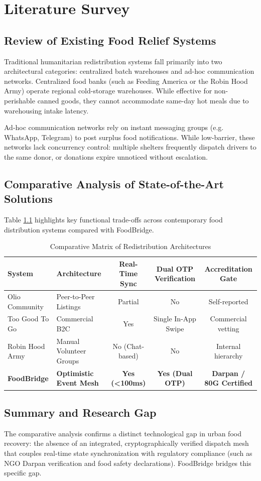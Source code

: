 \chapter{Literature Survey}
\label{ch:literature_survey}

\section{Review of Existing Food Relief Systems}
Traditional humanitarian redistribution systems fall primarily into two architectural categories: centralized batch warehouses and ad-hoc communication networks. Centralized food banks (such as Feeding America or the Robin Hood Army) operate regional cold-storage warehouses. While effective for non-perishable canned goods, they cannot accommodate same-day hot meals due to warehousing intake latency.

Ad-hoc communication networks rely on instant messaging groups (e.g. WhatsApp, Telegram) to post surplus food notifications. While low-barrier, these networks lack concurrency control: multiple shelters frequently dispatch drivers to the same donor, or donations expire unnoticed without escalation.

\section{Comparative Analysis of State-of-the-Art Solutions}
Table \ref{tab:literature_comparison} highlights key functional trade-offs across contemporary food distribution systems compared with FoodBridge.

\begin{table}[htbp]
\centering
\caption{Comparative Matrix of Redistribution Architectures}
\label{tab:literature_comparison}
\begin{tabularx}{\textwidth}{l X c c c}
\toprule
\textbf{System} & \textbf{Architecture} & \textbf{Real-Time Sync} & \textbf{Dual OTP Verification} & \textbf{Accreditation Gate} \\
\midrule
Olio Community & Peer-to-Peer Listings & Partial & No & Self-reported \\
Too Good To Go & Commercial B2C & Yes & Single In-App Swipe & Commercial vetting \\
Robin Hood Army & Manual Volunteer Groups & No (Chat-based) & No & Internal hierarchy \\
\textbf{FoodBridge} & \textbf{Optimistic Event Mesh} & \textbf{Yes (<100ms)} & \textbf{Yes (Dual OTP)} & \textbf{Darpan / 80G Certified} \\
\bottomrule
\end{tabularx}
\end{table}

\section{Summary and Research Gap}
The comparative analysis confirms a distinct technological gap in urban food recovery: the absence of an integrated, cryptographically verified dispatch mesh that couples real-time state synchronization with regulatory compliance (such as NGO Darpan verification and food safety declarations). FoodBridge bridges this specific gap.
